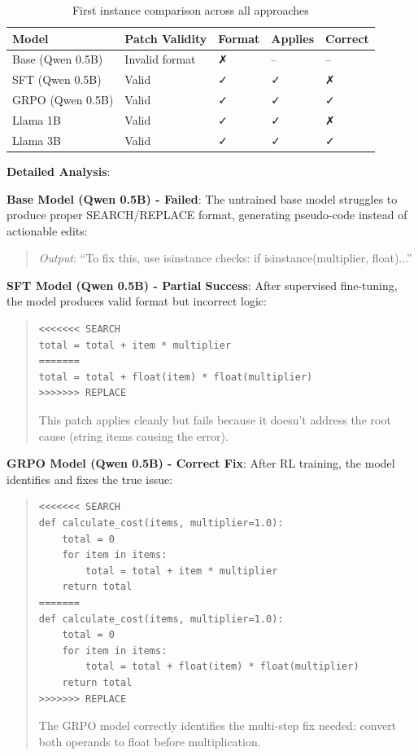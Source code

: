 \documentclass{article} %
\begin{document}
\begin{table}[t]
\caption{First instance comparison across all approaches}
\label{tab:first_instance}
\begin{center}
\begin{tabular}{lp{3cm}lll}
\hline
\textbf{Model} & \textbf{Patch Validity} & \textbf{Format} & \textbf{Applies} & \textbf{Correct} \\
\hline
Base (Qwen 0.5B) & Invalid format & ✗ & -- & -- \\
SFT (Qwen 0.5B) & Valid & ✓ & ✓ & ✗ \\
GRPO (Qwen 0.5B) & Valid & ✓ & ✓ & ✓ \\
Llama 1B & Valid & ✓ & ✓ & ✗ \\
Llama 3B & Valid & ✓ & ✓ & ✓ \\
\hline
\end{tabular}
\end{center}
\end{table}

\textbf{Detailed Analysis}:

\textbf{Base Model (Qwen 0.5B) - Failed}:
The untrained base model struggles to produce proper SEARCH/REPLACE format, generating pseudo-code instead of actionable edits:
\begin{quote}
\small
\textit{Output}: ``To fix this, use isinstance checks: if isinstance(multiplier, float)...''
\end{quote}

\textbf{SFT Model (Qwen 0.5B) - Partial Success}:
After supervised fine-tuning, the model produces valid format but incorrect logic:
\begin{quote}
\small
\begin{verbatim}
<<<<<<< SEARCH
total = total + item * multiplier
=======
total = total + float(item) * float(multiplier)
>>>>>>> REPLACE
\end{verbatim}

This patch applies cleanly but fails because it doesn't address the root cause (string items causing the error).
\end{quote}

\textbf{GRPO Model (Qwen 0.5B) - Correct Fix}:
After RL training, the model identifies and fixes the true issue:
\begin{quote}
\small
\begin{verbatim}
<<<<<<< SEARCH
def calculate_cost(items, multiplier=1.0):
    total = 0
    for item in items:
        total = total + item * multiplier
    return total
=======
def calculate_cost(items, multiplier=1.0):
    total = 0
    for item in items:
        total = total + float(item) * float(multiplier)
    return total
>>>>>>> REPLACE
\end{verbatim}

The GRPO model correctly identifies the multi-step fix needed: convert both operands to float before multiplication.
\end{quote}
\end{document}
